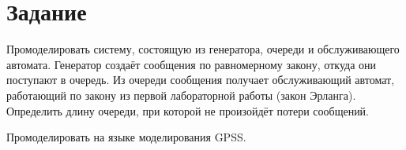 \chapter*{Задание}

Промоделировать систему, состоящую из генератора, очереди и обслуживающего автомата. Генератор создаёт сообщения по равномерному закону, откуда они поступают в очередь. Из очереди сообщения получает обслуживающий автомат, работающий по закону из первой лабораторной работы (закон Эрланга). Определить длину очереди, при которой не произойдёт потери сообщений.

Промоделировать на языке моделирования GPSS.